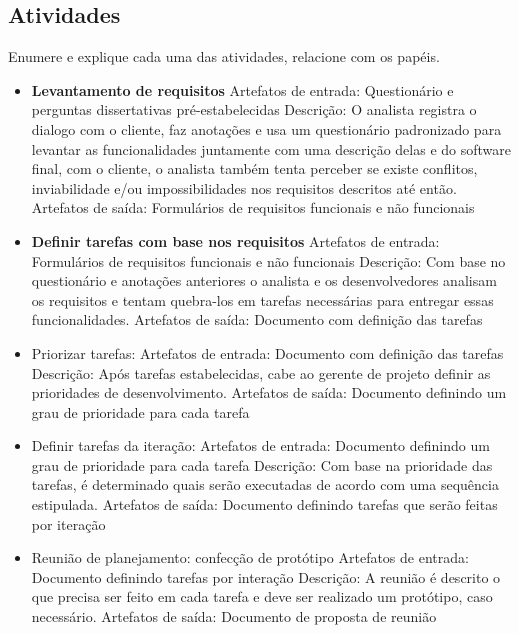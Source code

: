 \documentclass[	DIV=calc,%
							paper=a4,%
							fontsize=12pt,%
							onecolumn]{scrartcl}	 					%
\begin{document}
\subsection{Atividades}
Enumere e explique cada uma das atividades, relacione com os papéis.
\begin{itemize}
	\item \textbf{Levantamento de requisitos}
	\subitem Artefatos de entrada: Questionário e perguntas dissertativas pré-estabelecidas
	\subitem Descrição: O analista registra o dialogo com o cliente, faz anotações e usa um questionário padronizado para levantar as funcionalidades juntamente com uma descrição delas e do software final, com o cliente, o analista também tenta perceber se existe conflitos, inviabilidade e/ou impossibilidades nos requisitos descritos até então.
	\subitem Artefatos de saída: Formulários de requisitos funcionais e não funcionais	
	\item \textbf{Definir tarefas com base nos requisitos}
	\subitem Artefatos de entrada: Formulários de requisitos funcionais e não funcionais
	\subitem Descrição: Com base no questionário e anotações anteriores o analista e os desenvolvedores analisam os requisitos e tentam quebra-los em tarefas necessárias para entregar essas funcionalidades.
	\subitem Artefatos de saída: Documento com definição das tarefas

	\item Priorizar tarefas: 
	\subitem Artefatos de entrada: Documento com definição das tarefas
	\subitem Descrição: 
	Após tarefas estabelecidas, cabe ao gerente de projeto definir as prioridades de desenvolvimento.
	\subitem Artefatos de saída: Documento definindo um grau de prioridade para cada tarefa

	\item Definir tarefas da iteração: 
	\subitem Artefatos de entrada: Documento definindo um grau de prioridade para cada tarefa
	\subitem Descrição: Com base na prioridade das tarefas, é determinado quais serão executadas de acordo com uma sequência estipulada. 
	\subitem Artefatos de saída: Documento definindo tarefas que serão feitas por iteração
	
	\item Reunião de planejamento: confecção de protótipo
	\subitem Artefatos de entrada: Documento definindo tarefas por interação
	\subitem Descrição: 
	A reunião é descrito o que precisa ser feito em cada tarefa e deve ser realizado um protótipo, caso necessário.
	\subitem Artefatos de saída: Documento de proposta de reunião
	

\end{itemize}
\end{document}
